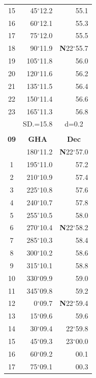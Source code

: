 \documentclass[10pt, a4paper]{report}
\begin{document}
\begin{scriptsize}
\begin{tabular*}{0.2\textwidth}[t]{@{\extracolsep{\fill}}|c|rr|}
15 & 45$^\circ$12.2 & \raisebox{0.24ex}{\boldmath$\cdot$~\boldmath$\cdot$~~}55.1\\
16 & 60$^\circ$12.1 & 55.3\\
17 & 75$^\circ$12.0 & 55.5\\[2Pt]
18 & 90$^\circ$11.9 & \textbf{N}22$^\circ$55.7\\
19 & 105$^\circ$11.8 & 56.0\\
20 & 120$^\circ$11.6 & 56.2\\
21 & 135$^\circ$11.5 & \raisebox{0.24ex}{\boldmath$\cdot$~\boldmath$\cdot$~~}56.4\\
22 & 150$^\circ$11.4 & 56.6\\
23 & 165$^\circ$11.3 & 56.8\\
\hline
\rule{0pt}{2.4ex} & \multicolumn{1}{c}{SD.=15.8} & \multicolumn{1}{c|}{d=0.2}\\
\hline
\multicolumn{1}{c}{}\\[-0.5ex]\hline
\multicolumn{1}{|c|}{\rule{0pt}{2.6ex}\textbf{09}} & \multicolumn{1}{c}{\textbf{GHA}} & \multicolumn{1}{c|}{\textbf{Dec}}\\
\hline\rule{0pt}{2.6ex}\noindent
0 & 180$^\circ$11.2 & \textbf{N}22$^\circ$57.0\\
1 & 195$^\circ$11.0 & 57.2\\
2 & 210$^\circ$10.9 & 57.4\\
3 & 225$^\circ$10.8 & \raisebox{0.24ex}{\boldmath$\cdot$~\boldmath$\cdot$~~}57.6\\
4 & 240$^\circ$10.7 & 57.8\\
5 & 255$^\circ$10.5 & 58.0\\[2Pt]
6 & 270$^\circ$10.4 & \textbf{N}22$^\circ$58.2\\
7 & 285$^\circ$10.3 & 58.4\\
8 & 300$^\circ$10.2 & 58.6\\
9 & 315$^\circ$10.1 & \raisebox{0.24ex}{\boldmath$\cdot$~\boldmath$\cdot$~~}58.8\\
10 & 330$^\circ$09.9 & 59.0\\
11 & 345$^\circ$09.8 & 59.2\\[2Pt]
12 & 0$^\circ$09.7 & \textbf{N}22$^\circ$59.4\\
13 & 15$^\circ$09.6 & 59.6\\
14 & 30$^\circ$09.4 & 22$^\circ$59.8\\
15 & 45$^\circ$09.3 & 23$^\circ$00.0\\
16 & 60$^\circ$09.2 & 00.1\\
17 & 75$^\circ$09.1 & 00.3\\[2Pt]

\end{tabular*}
\end{scriptsize}
\end{document}
